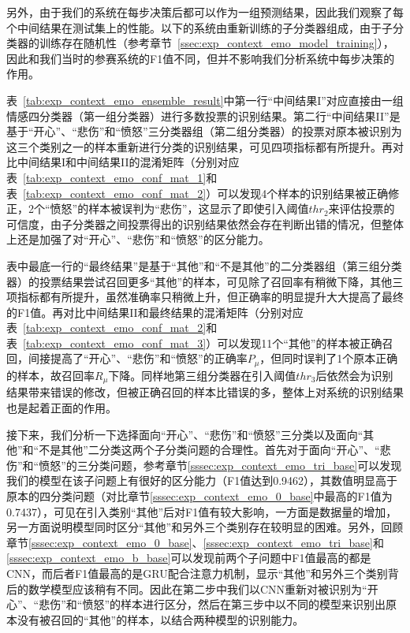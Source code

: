 另外，由于我们的系统在每步决策后都可以作为一组预测结果，因此我们观察了每个中间结果在测试集上的性能。以下的系统由重新训练的子分类器组成，由于子分类器的训练存在随机性（参考章节~\ref{ssec:exp_context_emo_model_training}），因此和我们当时的参赛系统的F1值不同，但并不影响我们分析系统中每步决策的作用。

表~\ref{tab:exp_context_emo_ensemble_result}中第一行“中间结果I”对应直接由一组情感四分类器（第一组分类器）进行多数投票的识别结果。第二行“中间结果II”是基于“开心”、“悲伤”和“愤怒”三分类器组（第二组分类器）的投票对原本被识别为这三个类别之一的样本重新进行分类的识别结果，可见四项指标都有所提升。再对比中间结果I和中间结果II的混淆矩阵（分别对应表~\ref{tab:exp_context_emo_conf_mat_1}和表~\ref{tab:exp_context_emo_conf_mat_2}）可以发现4个样本的识别结果被正确修正，2个“愤怒”的样本被误判为“悲伤”，这显示了即使引入阈值$thr_2$来评估投票的可信度，由子分类器之间投票得出的识别结果依然会存在判断出错的情况，但整体上还是加强了对“开心”、“悲伤”和“愤怒”的区分能力。

表中最底一行的“最终结果”是基于“其他”和“不是其他”的二分类器组（第三组分类器）的投票结果尝试召回更多“其他”的样本，可见除了召回率有稍微下降，其他三项指标都有所提升，虽然准确率只稍微上升，但正确率的明显提升大大提高了最终的F1值。再对比中间结果II和最终结果的混淆矩阵（分别对应表~\ref{tab:exp_context_emo_conf_mat_2}和表~\ref{tab:exp_context_emo_conf_mat_3}）可以发现11个“其他”的样本被正确召回，间接提高了“开心”、“悲伤”和“愤怒”的正确率$P_\mu$，但同时误判了1个原本正确的样本，故召回率$R_\mu$下降。同样地第三组分类器在引入阈值$thr_3$后依然会为识别结果带来错误的修改，但被正确召回的样本比错误的多，整体上对系统的识别结果也是起着正面的作用。

接下来，我们分析一下选择面向“开心”、“悲伤”和“愤怒”三分类以及面向“其他”和“不是其他”二分类这两个子分类问题的合理性。首先对于面向“开心”、“悲伤”和“愤怒”的三分类问题，参考章节\ref{sssec:exp_context_emo_tri_base}可以发现我们的模型在该子问题上有很好的区分能力（F1值达到0.9462），其数值明显高于原本的四分类问题（对比章节\ref{sssec:exp_context_emo_0_base}中最高的F1值为0.7437），可见在引入类别“其他”后对F1值有较大影响，一方面是数据量的增加，另一方面说明模型同时区分“其他”和另外三个类别存在较明显的困难。另外，回顾章节\ref{sssec:exp_context_emo_0_base}、\ref{sssec:exp_context_emo_tri_base}和\ref{sssec:exp_context_emo_b_base}可以发现前两个子问题中F1值最高的都是CNN，而后者F1值最高的是GRU配合注意力机制，显示“其他”和另外三个类别背后的数学模型应该稍有不同。因此在第二步中我们以CNN重新对被识别为“开心”、“悲伤”和“愤怒”的样本进行区分，然后在第三步中以不同的模型来识别出原本没有被召回的“其他”的样本，以结合两种模型的识别能力。

